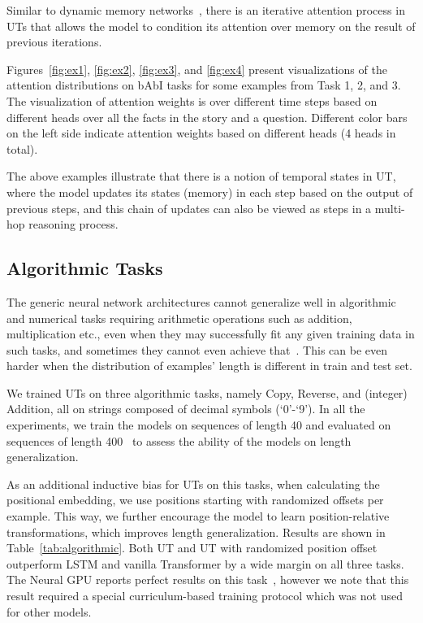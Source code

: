 Similar to dynamic memory networks~\citep{kumar2016ask}, there is an iterative attention process in UTs that allows the model to condition its attention over memory on the result of previous iterations. 
%



Figures~\ref{fig:ex1}, \ref{fig:ex2}, \ref{fig:ex3}, and \ref{fig:ex4} present visualizations of the attention distributions on bAbI tasks for some examples from Task 1, 2, and 3. The visualization of attention weights is over different time steps based on different heads over all the facts in the story and a question. Different color bars on the left side indicate attention weights based on different heads (4 heads in total).

The above examples illustrate that there is a notion of temporal states in UT, where the model updates its states (memory) in each step based on the output of previous steps, and this chain of updates can also be viewed as steps in a multi-hop reasoning process.

\subsection{Algorithmic Tasks}
The generic neural network architectures cannot generalize well in algorithmic and numerical tasks requiring arithmetic operations such as addition, multiplication etc., even when they may successfully fit any given training data in such tasks, and sometimes they cannot even achieve that~\citep{trask2018neural}. This can be even harder when the distribution of examples' length is different in train and test set.

We trained UTs on three algorithmic tasks, namely Copy, Reverse, and (integer) Addition, all on strings composed of decimal symbols (`0'-`9'). In all the experiments, we train the models on sequences of length 40 and evaluated on sequences of length 400~\citep{neural_gpu} to assess the ability of the models on length generalization.

As an additional inductive bias for UTs on this tasks, when calculating the positional embedding, we use  positions starting with randomized offsets per example. This way, we further encourage the model to learn position-relative transformations, which improves length generalization.
Results are shown in Table~\ref{tab:algorithmic}. Both UT and UT with randomized position offset outperform LSTM and vanilla Transformer by a wide margin on all three tasks. 
The Neural GPU reports perfect results on this task~\citep{neural_gpu}, however we note that this result required a special curriculum-based training protocol which was not used for other models.

